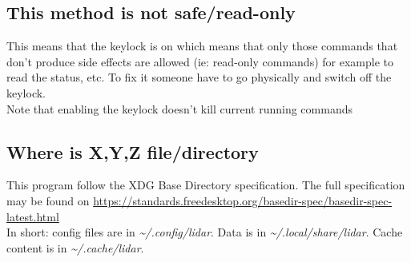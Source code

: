 \documentclass[letterpaper, 10 pt]{article}
\begin{document}
\subsection{This method is not safe/read-only}
This means that the keylock is on which means that only those commands that don't produce side effects are allowed (ie: read-only commands) for example to read the status, etc. To fix it someone have to go physically and switch off the keylock.\\
Note that enabling the keylock doesn't kill current running commands
\subsection{Where is X,Y,Z file/directory}
This program follow the XDG Base Directory specification. The full specification may be found on \url{https://standards.freedesktop.org/basedir-spec/basedir-spec-latest.html}\\
\linebreak
In short: config files are in \textit{ \~{}/.config/lidar}. Data is in \textit{\~{}/.local/share/lidar}. Cache content is in \textit{\~{}/.cache/lidar}.

\newpage

%
\end{document}
